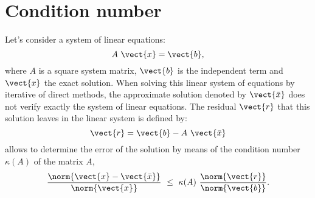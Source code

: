 

     \section{Condition number} 
     Let's consider a system of linear equations: 
      \begin{equation}
               A  \ \vect{x} = \vect{b},
               \label{LSE}
          \end{equation} 
     where $ A $ is a square system matrix,  $ \vect{b} $ is the independent 
     term and $ \vect{x}  $ the exact solution.  
     When solving this linear system of equations by iterative of direct 
     methods, the approximate solution denoted by  $  \vect{\bar x} $ does not 
     verify exactly the system of linear equations. 
     The residual $\vect{r} $  that this solution  leaves in the linear system 
     is defined by: 
       \begin{equation}
                   \vect{r} = \vect{b} - A \ \vect{ \bar x}
                   \label{residual}
          \end{equation} 
     allows to determine the error of the solution by means of the condition 
     number $\kappa(A)$ of the matrix $A$,  
      \begin{equation}
          \frac{\norm{ \vect{x} - \vect{\bar x}  }}{\norm{ \vect{x}}} \ \leq \
               \kappa(A) \
               \frac{\norm{ \vect{r}}}{\norm{\vect{b}}}.
               \label{error}
     \end{equation}
     

